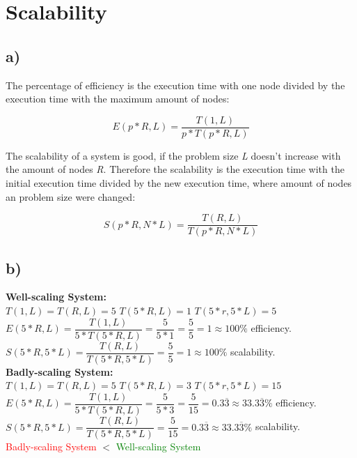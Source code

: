 \documentclass{article}
\begin{document}
  \newpage
  \section{Scalability}
    
    \subsection*{a) }
      
      The percentage of efficiency is the execution time with one node divided by the execution time with the maximum amount of nodes:
      
      \[ E(p*R, L) = \dfrac{T(1, L)}{p*T(p*R, L)} \]
      
      The scalability of a system is good, if the problem size \textit{L} doesn't increase with the amount of nodes \textit{R}. Therefore the scalability is the execution time with the initial execution time divided by the new execution time, where amount of nodes an problem size were changed: 
      
      \[ S(p*R, N*L) = \dfrac{T(R, L)}{T(p*R, N*L)} \]
      
    \subsection*{b) }
    
      \textbf{Well-scaling System:} \\
      $T(1, L) = T(R, L) = 5$ \hspace{1cm}
      $T(5*R, L) = 1$ \hspace{1cm}
      $T(5*r, 5*L) = 5$ \\
      \newline
      $E(5*R, L)= \dfrac{T(1, L)}{5*T(5*R, L)} = \dfrac{5}{5*1} = \dfrac{5}{5} = 1 \approx 100\% $ efficiency.\\
      $S(5*R, 5*L)= \dfrac{T(R, L)}{T(5*R, 5*L)} = \dfrac{5}{5} = 1 \approx 100\%$ scalability.\\
      \vspace{1cm}
      \newline
      \textbf{Badly-scaling System:} \\
      $T(1, L) = T(R, L) = 5$ \hspace{1cm}
      $T(5*R, L) = 3$ \hspace{1cm}
      $T(5*r, 5*L) = 15$\\
      \newline
      $E(5*R, L)= \dfrac{T(1, L)}{5*T(5*R, L)} = \dfrac{5}{5*3} = \dfrac{5}{15} = 0.3\overline{3} \approx 33.3\overline{3} \% $ efficiency.\\
      $S(5*R, 5*L)= \dfrac{T(R, L)}{T(5*R, 5*L)} = \dfrac{5}{15} = 0.3\overline{3} \approx 33.3\overline{3} \%$ scalability.\\
      \vspace{1cm}
      \newline
      \textcolor{red}{Badly-scaling System} $ < $ \textcolor{green}{Well-scaling System}
\end{document}
